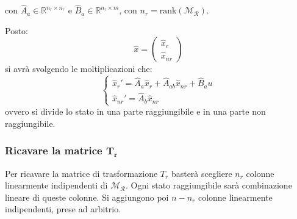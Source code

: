 \documentclass[a4paper,11pt]{article}
\begin{document}
con $\hat{A}_a \in \mathbb{R}^{n_r \times n_r}$ e $\hat{B}_a \in \mathbb{R}^{n_r \times m}$, con $n_r = \mathrm{rank}(\mathcal{M}_\mathcal{R})$.

Posto:
$$
\hat{x} = \begin{pmatrix}
	\hat{x}_r \\ 
	\hat{x}_{nr}
\end{pmatrix}
$$
si avrà svolgendo le moltiplicazioni che:
\[
	\begin{cases}
		\hat{x}_r' = \hat{A}_a \hat{x}_r + \hat{A}_{ab} \hat{x}_{nr} + \hat{B}_a u\\
		\hat{x}_{nr}' = \hat{A}_b \hat{x}_{nr}
	\end{cases}
\]
ovvero si divide lo stato in una parte raggiungibile e in una parte non raggiungibile.

\subsubsection{Ricavare la matrice $\mathbf{T_r}$}
Per ricavare la matrice di trasformazione $T_r$ basterà scegliere $n_r$ colonne linearmente indipendenti di $\mathcal{M}_\mathcal{R}$.
Ogni stato raggiungibile sarà combinazione lineare di queste colonne.
Si aggiungono poi $n - n_r$ colonne linearmente indipendenti, prese ad arbitrio.
\end{document}
